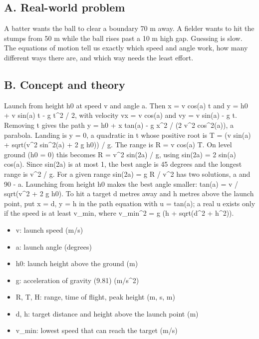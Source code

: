 \documentclass[11pt,a4paper]{article}
\begin{document}
\subsection*{A. Real-world problem}
A batter wants the ball to clear a boundary 70 m away. A fielder wants to hit the stumps from 50 m while the ball rises past a 10 m high gap. Guessing is slow. The equations of motion tell us exactly which speed and angle work, how many different ways there are, and which way needs the least effort.

\subsection*{B. Concept and theory}
Launch from height h0 at speed v and angle a. Then x = v cos(a) t and y = h0 + v sin(a) t - g t\textasciicircum{}2 / 2, with velocity vx = v cos(a) and vy = v sin(a) - g t. Removing t gives the path y = h0 + x tan(a) - g x\textasciicircum{}2 / (2 v\textasciicircum{}2 cos\textasciicircum{}2(a)), a parabola. Landing is y = 0, a quadratic in t whose positive root is T = (v sin(a) + sqrt(v\textasciicircum{}2 sin\textasciicircum{}2(a) + 2 g h0)) / g. The range is R = v cos(a) T. On level ground (h0 = 0) this becomes R = v\textasciicircum{}2 sin(2a) / g, using sin(2a) = 2 sin(a) cos(a). Since sin(2a) is at most 1, the best angle is 45 degrees and the longest range is v\textasciicircum{}2 / g. For a given range sin(2a) = g R / v\textasciicircum{}2 has two solutions, a and 90 - a. Launching from height h0 makes the best angle smaller: tan(a) = v / sqrt(v\textasciicircum{}2 + 2 g h0). To hit a target d metres away and h metres above the launch point, put x = d, y = h in the path equation with u = tan(a); a real u exists only if the speed is at least v\_min, where v\_min\textasciicircum{}2 = g (h + sqrt(d\textasciicircum{}2 + h\textasciicircum{}2)).

\begin{itemize}[nosep]
\item v: launch speed (m/s)
\item a: launch angle (degrees)
\item h0: launch height above the ground (m)
\item g: acceleration of gravity (9.81) (m/s\textasciicircum{}2)
\item R, T, H: range, time of flight, peak height (m, s, m)
\item d, h: target distance and height above the launch point (m)
\item v\_min: lowest speed that can reach the target (m/s)
\end{itemize}
\end{document}
